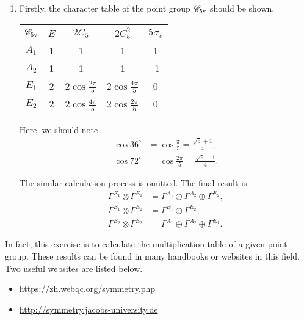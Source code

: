 \documentclass[a4paper]{book}
\begin{document}
\begin{solution}
\begin{enumerate}[label=(\alph*)]
		\item Firstly, the character table of the point group $\mathscr{C}_{\rm 5v}$ should be shown.
		\begin{center}
		\begin{tabular}{ccccc}\hline
	$\mathscr{C}_{\rm 5v}$ & $E$ & $2C_5$ & $2C^2_5$ & $5\sigma_v$ \\ \hline
			$A_1$	&	1	&	1	&	1	&	1	\\
			$A_2$	&	1	&	1	&	1	&	-1	\\
			$E_1$	&	2	&	2$\cos{\frac{2\pi}{5}}$	&	2$\cos{\frac{4\pi}{5}}$	&	0	\\
			$E_2$	&	2	&	2$\cos{\frac{4\pi}{5}}$	&	2$\cos{\frac{2\pi}{5}}$	&	0	\\ \hline
		\end{tabular}
		\end{center}
		
		Here, we should note
		\begin{align*}
			\cos{36^\circ} &= \cos{\frac{\pi}{5}} = \frac{\sqrt{5}+1}{4},	\\
			\cos{72^\circ} &=\cos{\frac{2\pi}{5}} = \frac{\sqrt{5}-1}{4}.
\end{align*}				
		
		The similar calculation process is omitted. The final result is
		\begin{align}
			\Gamma^{E_1}\otimes\Gamma^{E_1} &= \Gamma^{A_1}\oplus \Gamma^{A_2} \oplus \Gamma^{E_2}, \\
			\Gamma^{E_1}\otimes\Gamma^{E_2} &= \Gamma^{E_1}\oplus \Gamma^{E_2}, \\
			\Gamma^{E_2}\otimes\Gamma^{E_2} &= \Gamma^{A_1}\oplus \Gamma^{A_2} \oplus \Gamma^{E_1}.
		\end{align}
		
		\end{enumerate}				
		
	\end{solution}
	
	\begin{remark}
		In fact, this exercise is to calculate the multiplication table of a given point group. These results can be found in many handbooks or websites in this field. Two useful websites are listed below.
		\begin{itemize}
		
		\item \url{https://zh.webqc.org/symmetry.php}
	
		\item \url{http://symmetry.jacobs-university.de}

		\end{itemize}			
		 
	\end{remark}
\end{document}
